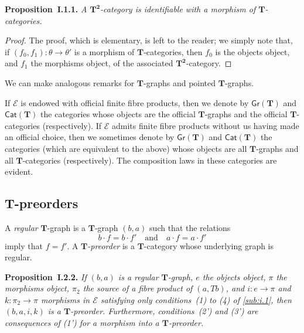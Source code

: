\documentclass[fleqn]{article}
\newenvironment{itenv}[1]
  {\phantomsection\par\medskip\noindent\textbf{#1.}\itshape}
  {\par\medskip}
\newcommand{\oldpage}[1]{\marginpar{\footnotesize$\Big\vert$ \textit{p.~#1}}}
\newcommand{\TT}{\mathbf{T}}
\newcommand{\textand}{\quad\text{and}\quad}
\newcommand{\cat}[1]{\mathcal{#1}}
\newcommand{\Cat}[1]{\mathsf{#1}}
\newcommand{\Gr}[1]{\Cat{Gr}(#1)}
\begin{document}
\begin{itenv}{Proposition~I.1.1}
  A $\TT^\mathbf{2}$-category is identifiable with a morphism of $\TT$-categories.
\end{itenv}

\begin{proof}
  The proof, which is elementary, is left to the reader;
  we simply note that, if $(f_0,f_1)\colon\theta\to\theta'$ is a morphism of $\TT$-categories, then $f_0$ is the objects object, and $f_1$ the morphisms object, of the associated $\TT^\mathbf{2}$-category.
\end{proof}

We can make analogous remarks for $\TT$-graphs and pointed $\TT$-graphs.

\oldpage{229}
If $\cat{E}$ is endowed with official finite fibre products, then we denote by $\Gr{\TT}$ and $\Cat{Cat}(\TT)$ the categories whose objects are the official $\TT$-graphs and the official $\TT$-categories (respectively).
If $\cat{E}$ admits finite fibre products without us having made an official choice, then we sometimes denote by $\Gr{\TT}$ and $\Cat{Cat}(\TT)$ the categories (which are equivalent to the above) whose objects are all $\TT$-graphs and all $\TT$-categories (respectively).
The composition laws in these categories are evident.


\subsection{$\TT$-preorders}
\label{sub:i.2}

A \emph{regular} $\TT$-graph is a $\TT$-graph $(b,a)$ such that the relations
\[
  b\cdot f = b\cdot f'
  \textand
  a\cdot f = a\cdot f'
\]
imply that $f=f'$.
A \emph{$\TT$-preorder} is a $\TT$-category whose underlying graph is regular.

\begin{itenv}{Proposition~I.2.2}
  If $(b,a)$ is a regular $\TT$-graph, $e$ the objects object, $\pi$ the morphisms object, $\pi_2$ the source of a fibre product of $(a,Tb)$, and $i\colon e\to\pi$ and $k\colon\pi_2\to\pi$ morphisms in $\cat{E}$ satisfying only conditions~(1) to (4) of \cref{sub:i.1}, then $(b,a,i,k)$ is a $\TT$-preorder.
  Furthermore, conditions~(2') and (3') are consequences of (1') for a morphism into a $\TT$-preorder.
\end{itenv}
\end{document}
